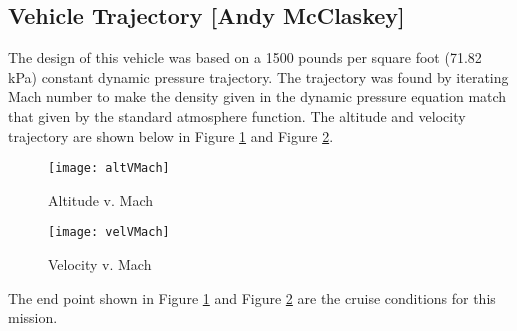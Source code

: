 \subsection{Vehicle Trajectory [Andy McClaskey]}
The design of this vehicle was based on a 1500 pounds per square foot (71.82 kPa) constant dynamic pressure trajectory. The trajectory was found by iterating Mach number to make the density given in the dynamic pressure equation match that given by the standard atmosphere function. The altitude and velocity trajectory are shown below in Figure \ref{fig:altVMach} and Figure \ref{fig:velVMach}.

\begin{figure}[H]
\begin{center}
\texttt{[image: altVMach]}
\caption{Altitude v. Mach}
\label{fig:altVMach}
\end{center}
\end{figure}

\begin{figure}[H]
\begin{center}
\texttt{[image: velVMach]}
\caption{Velocity v. Mach}
\label{fig:velVMach}
\end{center}
\end{figure}

The end point shown in Figure \ref{fig:altVMach} and Figure \ref{fig:velVMach} are the cruise conditions for this mission.